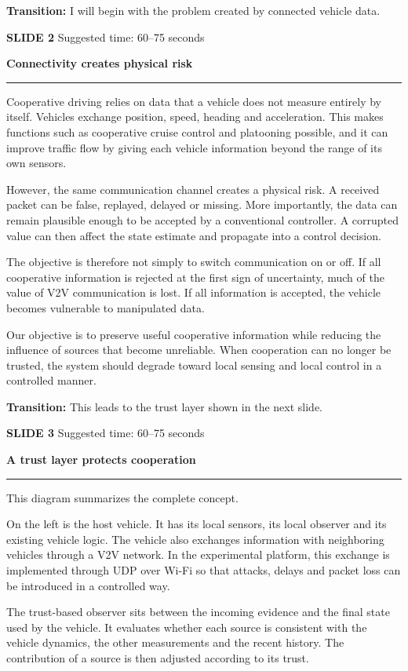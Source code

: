 \documentclass[11pt,a4paper]{article}
\newcommand{\slidetitle}[3]{%
  \clearpage
  {\color{Accent}\large\bfseries SLIDE #1}\hfill
  {\color{Muted}\small Suggested time: #3}\par
  \vspace{0.18cm}
  {\LARGE\bfseries #2}\par
  \vspace{0.20cm}
  {\color{Muted}\rule{\textwidth}{0.5pt}}\par
  \vspace{0.12cm}
}
\newcommand{\transition}[1]{%
  \vfill
  \colorbox{Panel}{%
    \parbox{\dimexpr\textwidth-2\fboxsep\relax}{%
      \raggedright\textbf{Transition:} #1}}
}
\begin{document}
\transition{I will begin with the problem created by connected vehicle data.}

\slidetitle{2}{Connectivity creates physical risk}{60--75 seconds}

Cooperative driving relies on data that a vehicle does not measure entirely by itself. Vehicles exchange position, speed, heading and acceleration. This makes functions such as cooperative cruise control and platooning possible, and it can improve traffic flow by giving each vehicle information beyond the range of its own sensors.

However, the same communication channel creates a physical risk. A received packet can be false, replayed, delayed or missing. More importantly, the data can remain plausible enough to be accepted by a conventional controller. A corrupted value can then affect the state estimate and propagate into a control decision.

The objective is therefore not simply to switch communication on or off. If all cooperative information is rejected at the first sign of uncertainty, much of the value of V2V communication is lost. If all information is accepted, the vehicle becomes vulnerable to manipulated data.

Our objective is to preserve useful cooperative information while reducing the influence of sources that become unreliable. When cooperation can no longer be trusted, the system should degrade toward local sensing and local control in a controlled manner.

\transition{This leads to the trust layer shown in the next slide.}

\slidetitle{3}{A trust layer protects cooperation}{60--75 seconds}

This diagram summarizes the complete concept.

On the left is the host vehicle. It has its local sensors, its local observer and its existing vehicle logic. The vehicle also exchanges information with neighboring vehicles through a V2V network. In the experimental platform, this exchange is implemented through UDP over Wi-Fi so that attacks, delays and packet loss can be introduced in a controlled way.

The trust-based observer sits between the incoming evidence and the final state used by the vehicle. It evaluates whether each source is consistent with the vehicle dynamics, the other measurements and the recent history. The contribution of a source is then adjusted according to its trust.
\end{document}
